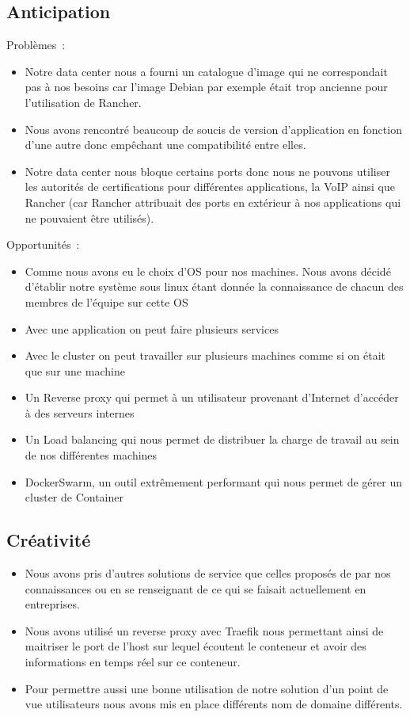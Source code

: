 \subsection{Anticipation}

Problèmes~:

\begin{itemize}
\item
  Notre data center nous a fourni un catalogue d'image qui ne
  correspondait pas à nos besoins car l'image Debian par exemple était
  trop ancienne pour l'utilisation de Rancher.
\item
  Nous avons rencontré beaucoup de soucis de version d'application en
  fonction d'une autre donc empêchant une compatibilité entre elles.
\item
  Notre data center nous bloque certains ports donc nous ne pouvons
  utiliser les autorités de certifications pour différentes
  applications, la VoIP ainsi que Rancher (car Rancher attribuait des
  ports en extérieur à nos applications qui ne pouvaient être utilisés).
\end{itemize}

Opportunités~:

\begin{itemize}
\item
  Comme nous avons eu le choix d'OS pour nos machines. Nous avons décidé
  d'établir notre système sous linux étant donnée la connaissance de
  chacun des membres de l'équipe sur cette OS
\item
  Avec une application on peut faire plusieurs services
\item
  Avec le cluster on peut travailler sur plusieurs machines comme si on
  était que sur une machine
\item
  Un Reverse proxy qui permet à un utilisateur provenant d'Internet
  d'accéder à des serveurs internes
\item
  Un Load balancing qui nous permet de distribuer la charge de travail
  au sein de nos différentes machines
\item
  DockerSwarm, un outil extrêmement performant qui nous permet de gérer
  un cluster de Container
\end{itemize}

\subsection{Créativité}

\begin{itemize}
\item Nous avons pris d'autres solutions de service que celles proposés de par nos connaissances ou en se renseignant de ce qui se faisait actuellement en entreprises.
\item Nous avons utilisé un reverse proxy avec Traefik nous permettant ainsi de maitriser le port de l'host sur lequel écoutent le conteneur et avoir des informations en temps réel sur ce conteneur.
\item Pour permettre aussi une bonne utilisation de notre solution d'un point de vue utilisateurs nous avons mis en place différents nom de domaine différents.
\end{itemize}

